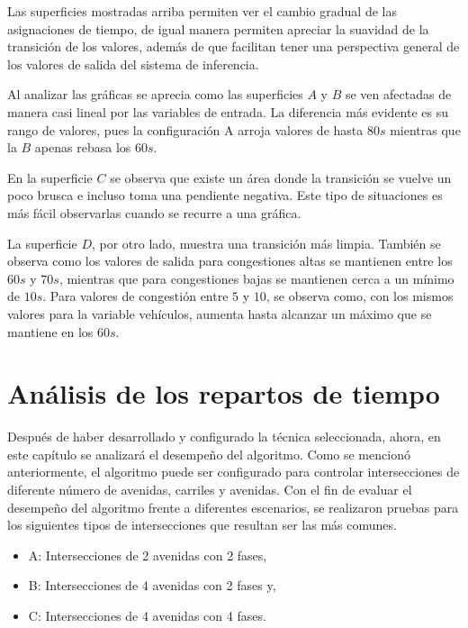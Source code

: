 Las superficies mostradas arriba permiten ver el cambio gradual de las asignaciones de tiempo, de igual manera permiten apreciar la suavidad de la transición de los valores, además de que facilitan tener una perspectiva general de los valores de salida del sistema de inferencia.

Al analizar las gráficas se aprecia como las superficies $A$ y $B$ se ven afectadas de manera casi lineal por las variables de entrada. La diferencia más evidente es su rango de valores, pues la configuración A arroja valores de hasta $80s$ mientras que la $B$ apenas rebasa los $60s$.

En la superficie $C$ se observa que existe un área donde la transición se vuelve un poco brusca e incluso toma una pendiente negativa. Este tipo de situaciones es más fácil observarlas cuando se recurre a una gráfica.

La superficie $D$, por otro lado, muestra una transición más limpia. También se observa como los valores de salida para congestiones altas se mantienen entre los $60s$ y $70s$, mientras que para congestiones bajas se mantienen cerca a un mínimo de $10s$.
Para valores de congestión entre $5$ y $10$, se observa como, con los mismos valores para la variable vehículos, aumenta hasta alcanzar un máximo que se mantiene en los $60s$.

\section{Análisis de los repartos de tiempo}
Después de haber desarrollado y configurado la técnica seleccionada, ahora, en este capítulo se analizará el desempeño del algoritmo. Como se mencionó anteriormente, el algoritmo puede ser configurado para controlar intersecciones de diferente número de avenidas, carriles y avenidas. Con el fin de evaluar el desempeño del algoritmo frente a diferentes escenarios, se realizaron pruebas para los siguientes tipos de intersecciones que resultan ser las más comunes. 

{\setlength{\baselineskip}{0.5\baselineskip}
\begin{itemize}
	\item A: Intersecciones de 2 avenidas con 2 fases,
	\item B: Intersecciones de 4 avenidas con 2 fases y,
	\item C: Intersecciones de 4 avenidas con 4 fases.
\end{itemize}}

